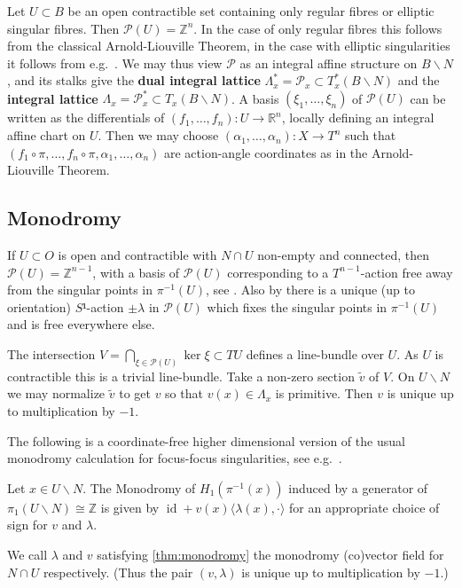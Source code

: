 \documentclass[12pt,a4paper,abstract=true,draft]{scrartcl}
\DeclareMathOperator{\id}{id}
\begin{document}
Let $U ⊂ B$ be an open contractible set containing only regular fibres or elliptic singular fibres.
Then $𝒫(U) = ℤ^n$.
In the case of only regular fibres this follows from the classical Arnold-Liouville Theorem, in the case with elliptic singularities it follows from e.g.\ \cite{DuMo91}.
We may thus view $𝒫$ as an integral affine structure on $B ∖ N$, and its stalks give the \textbf{dual integral lattice} $Λ_x^* = 𝒫_x ⊂ T_x^*(B ∖ N)$ and the \textbf{integral lattice} $Λ_x = 𝒫_x^* ⊂ T_x(B ∖ N)$.
A basis $(ξ_1,…,ξ_n)$ of $𝒫(U)$ can be written as the differentials of $(f_1,…,f_n) \colon U → ℝ^n$, locally defining an integral affine chart on $U$.
Then we may choose $(α_1,…,α_n) \colon X → T^n$ such that $(f_1∘π, … , f_n∘π, α_1, …, α_n)$ are action-angle coordinates as in the Arnold-Liouville Theorem.

\iffalse
More generally if $(f_1,…,f_n)$ are local coordinates on $B$ (not necessarily with $df_i ∈ 𝒫(U)$), then for any Lagrangian section $σ\colon O → X$ there are $α_1,…,α_n \colon X → ℝ^n$ such that $(f_1 ∘π,…,f_n ∘π, α_1,…,α_n)$ are Liouville coordinates on a neighbourhood of $σ(B)$.
These satisfy
\begin{align*}
  \{f_iπ,α_j\} &= δ_{ij} & \{f_iπ,f_jπ\} &= 0 & \{α_i,α_j\} = 0 \; .
\end{align*}
In particular $π_* X_{α_i} = ∂_{f_i} π$, as $df_i π_* X_{α_j} = d(f_iπ) X_{α_j} = \{f_iπ,α_j\} = δ_{ij}$.
\fi

\subsection{Monodromy}

If $U ⊂ O$ is open and contractible with $N ∩ U$ non-empty and connected, then $𝒫(U) = ℤ^{n-1}$, with a basis of $𝒫(U)$ corresponding to a $T^{n-1}$-action free away from the singular points in $π^{-1}(U)$, see \cite[Theorem 5.2 a)]{Zun96}.
Also by \cite[Theorem 5.2 b)]{Zun96} there is a unique (up to orientation) $S¹$-action $±λ$ in $𝒫(U)$ which fixes the singular points in $π^{-1}(U)$ and is free everywhere else.

The intersection $V = ⋂_{ξ ∈ 𝒫(U)} \ker ξ ⊂ TU$ defines a line-bundle over $U$.
As $U$ is contractible this is a trivial line-bundle.
Take a non-zero section $\tilde{v}$ of $V$.
On $U ∖ N$ we may normalize $\tilde{v}$ to get $v$ so that $v(x) ∈ Λ_x$ is primitive.
Then $v$ is unique up to multiplication by $-1$.

The following is a coordinate-free higher dimensional version of the usual monodromy calculation for focus-focus singularities, see e.g.\ \cite[Lemma 1]{Zun97}.
\begin{lemma}[Monodromy]
  \label{thm:monodromy}
  Let $x ∈ U ∖ N$.
  The Monodromy of $H_1(π^{-1}(x))$ induced by a generator of $π_1(U ∖ N) ≅ ℤ$ is given by
  $\id + v(x) ⟨λ(x), · ⟩$
  for an appropriate choice of sign for $v$ and $λ$.
\end{lemma}
We call $λ$ and $v$ satisfying \cref{thm:monodromy} the monodromy (co)vector field for $N ∩ U$ respectively. (Thus the pair $(v,λ)$ is unique up to multiplication by $-1$.)
\end{document}
